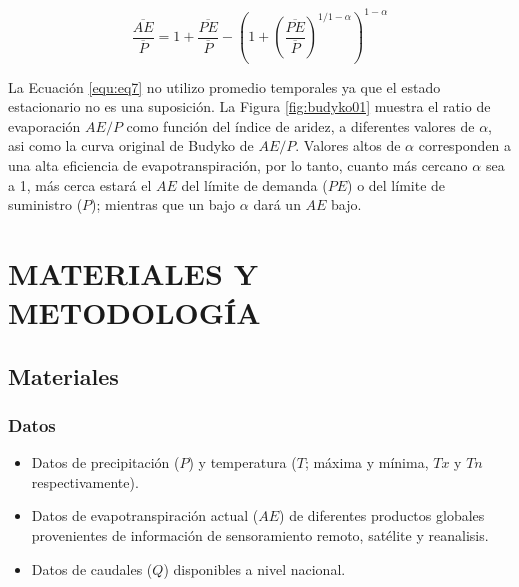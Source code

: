 \documentclass[12pt]{article}
\begin{document}
\begin{equation}
\frac{\overline{AE}}{\overline{P}} = 1 + \frac{\overline{PE}}{\overline{P}} - \left (1 + \left ( \frac{\overline{PE}}{\overline{P}} \right )^{1/1-\alpha}  \right )^{1-\alpha}
\label{equ:eq7}
\end{equation}



La Ecuación \ref{equ:eq7} no utilizo promedio temporales ya que el estado estacionario no es una suposición. La Figura \ref{fig:budyko01} muestra el ratio de evaporación $AE/P$ como función del índice de aridez, a diferentes valores de $\alpha$, asi como la curva original de Budyko de $AE/P$. Valores altos de $\alpha$ corresponden a una alta eficiencia de evapotranspiración, por lo tanto, cuanto más cercano $\alpha$ sea a 1, más cerca estará el $AE$ del límite de demanda ($PE$) o del límite de suministro ($P$); mientras que un bajo $\alpha$ dará un $AE$ bajo.

\clearpage



\clearpage
\vspace*{0.5mm}
\section{MATERIALES Y METODOLOGÍA}

\subsection{Materiales}

\subsubsection{Datos}

\begin{itemize}
  
  \item Datos de precipitación ($P$) y temperatura ($T$; máxima y mínima, $Tx$ y $Tn$ respectivamente).
  
  \item Datos de evapotranspiración actual ($AE$) de diferentes productos globales provenientes de información de sensoramiento remoto, satélite y reanalisis.
  
  \item Datos de caudales ($Q$) disponibles a nivel nacional.

\end{itemize}
\end{document}

